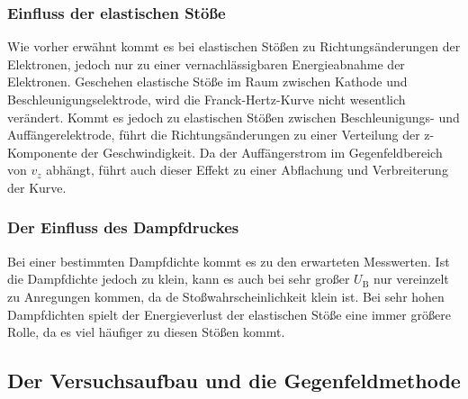 \subsubsection{Einfluss der elastischen Stöße}

Wie vorher erwähnt kommt es bei elastischen Stößen zu Richtungsänderungen der Elektronen, jedoch nur zu einer vernachlässigbaren Energieabnahme der Elektronen.
Geschehen elastische Stöße im Raum zwischen Kathode und Beschleunigungselektrode, wird die Franck-Hertz-Kurve nicht wesentlich verändert.
Kommt es jedoch zu elastischen Stößen zwischen Beschleunigungs- und Auffängerelektrode, führt die Richtungsänderungen zu einer Verteilung der z-Komponente der Geschwindigkeit.
Da der Auffängerstrom im Gegenfeldbereich von $v_z$ abhängt, führt auch dieser Effekt zu einer Abflachung und Verbreiterung der Kurve.

\subsubsection{Der Einfluss des Dampfdruckes}

Bei einer bestimmten Dampfdichte kommt es zu den erwarteten Messwerten. Ist die Dampfdichte jedoch zu klein, kann es auch bei sehr großer $U_\text{B}$ nur vereinzelt
zu Anregungen kommen, da de Stoßwahrscheinlichkeit klein ist. Bei sehr hohen Dampfdichten spielt der Energieverlust der elastischen Stöße eine immer größere Rolle, da es viel häufiger zu
diesen Stößen kommt.

\subsection{Der Versuchsaufbau und die Gegenfeldmethode}

